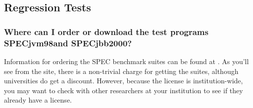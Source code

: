 \subsection{Regression Tests}
\subsubsection{Where can I order or download the test programs 
SPECjvm98\trademark and SPECjbb2000\trademark?}



Information for ordering the SPEC benchmark suites can be found at
.
As you'll see from the site, there is a non-trivial charge for getting the
suites, although universities do get a discount.
However, because the license is institution-wide, you may want to check with
other researchers at your institution to see if they already have a license.

\JavaTMFooter
 
